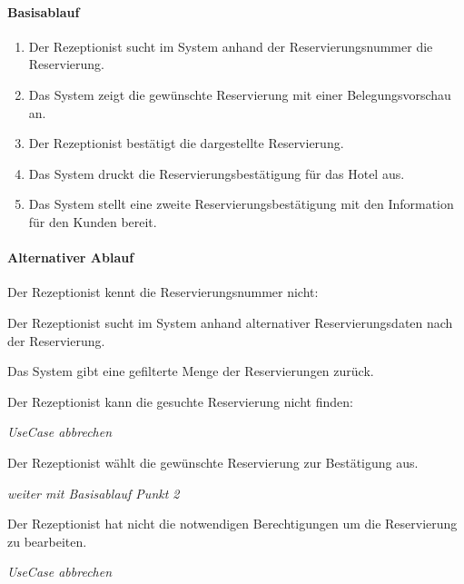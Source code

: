 \paragraph{Basisablauf}
\begin{enumerate}
	\item Der \Gls{Rezeptionist} sucht im System anhand der \Gls{Reservierungsnummer} die \Gls{Reservierung}.
	\item Das System zeigt die gewünschte \Gls{Reservierung} mit einer \Gls{Belegungsvorschau} an.
	\item Der \Gls{Rezeptionist} bestätigt die dargestellte \Gls{Reservierung}.
	\item Das System druckt die Reservierungsbestätigung für das Hotel aus.
	\item Das System stellt eine zweite Reservierungsbestätigung mit den Information für den \Gls{Kunde}n bereit.
\end{enumerate}

\paragraph{Alternativer Ablauf}
\begin{longenum}
	\item
	\begin{longenum}
		\item Der Rezeptionist kennt die \Gls{Reservierungsnummer} nicht:
		\begin{longenum}
			\item Der \Gls{Rezeptionist} sucht im System anhand alternativer Reservierungsdaten nach der \Gls{Reservierung}.
			\item Das System gibt eine gefilterte Menge der \Gls{Reservierung}en zurück.
			\begin{longenum}
				\item Der \Gls{Rezeptionist} kann die gesuchte \Gls{Reservierung} nicht finden:
				\begin{longenum}
					\item \emph{UseCase abbrechen}
				\end{longenum}
			\end{longenum}
			\item Der \Gls{Rezeptionist} wählt die gewünschte \Gls{Reservierung} zur Bestätigung aus.
			\item \emph{weiter mit Basisablauf Punkt 2}
		\end{longenum}
	\end{longenum}
	\item
	\item
	\begin{longenum}
		\item Der \Gls{Rezeptionist} hat nicht die notwendigen Berechtigungen um die \Gls{Reservierung} zu bearbeiten.
		\begin{longenum}
			\item \emph{UseCase abbrechen}
		\end{longenum}
	\end{longenum}
	\item
	\item
\end{longenum}

